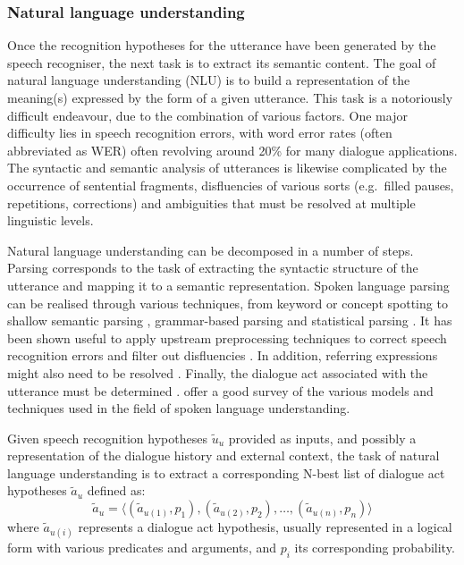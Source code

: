 \subsubsection*{Natural language understanding}
\label{section:speechunderstanding}

Once the recognition hypotheses for the utterance have been generated by the speech recogniser, the next task is to extract its semantic content.  The goal of natural language understanding (NLU) is to build a representation of the meaning(s) expressed by the form of a given utterance.  This task is a notoriously difficult endeavour, due to the combination of various factors. One major difficulty lies in speech recognition errors, with word error rates (often abbreviated as WER) often revolving around 20\% for many dialogue applications.  The syntactic and semantic analysis of utterances is likewise complicated by the occurrence of sentential fragments,  disfluencies of various sorts (e.g.\ filled pauses, repetitions, corrections) and ambiguities that must be resolved at multiple linguistic levels. 

Natural language understanding can be decomposed in a number of steps.  Parsing corresponds to the task of extracting the syntactic structure of the utterance and mapping it to a semantic representation.  Spoken language parsing can be realised through various techniques, from keyword or concept spotting \citep{KomataniTKK01,ZhangZY07} to shallow semantic parsing \citep{Coppola:2009}, grammar-based parsing \citep{VanNoord1999} and statistical parsing \citep{He200585}.  It has been shown useful to apply upstream preprocessing techniques to correct speech recognition errors \citep{Ringger:1996} and filter out disfluencies \citep{Johnson:2004}. In addition, referring expressions might also need to be resolved \citep{Funakoshi:2012}.  Finally, the dialogue act associated with the utterance must be determined \citep{stolcke2000,Keizer2007}. \cite{demori2008} offer a good survey of the various models and techniques used in the field of spoken language understanding. 

Given speech recognition hypotheses $\tilde{u}_u$ provided as inputs, and possibly a representation of the dialogue history and external context, the task of natural language understanding is to extract a corresponding N-best list of dialogue act hypotheses $\tilde{a}_u$ defined as: \begin{equation*}
\tilde{a}_u = \langle (\tilde{a}_{u(1)}, p_{1}), (\tilde{a}_{u(2)}, p_{2}), \dots, (\tilde{a}_{u(n)}, p_{n})\rangle
\end{equation*}
where $\tilde{a}_{u(i)}$ represents a dialogue act hypothesis, usually represented in a logical form with various predicates and arguments, and $p_{i}$ its corresponding probability.

